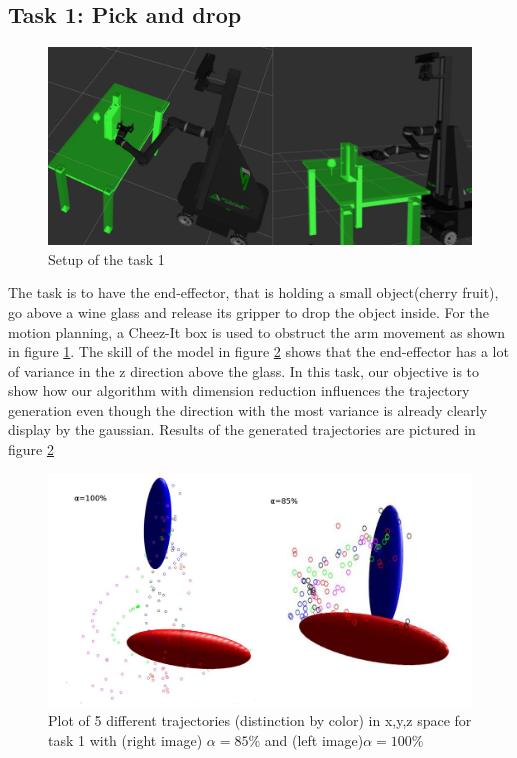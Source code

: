 \documentclass[letterpaper, 10 pt, conference]{ieeeconf}  %
\begin{document}
\subsection{Task 1: Pick and drop}
\begin{figure}[h]
	\centering
	\includegraphics[scale=0.22]{figure/task1Scenario.png}
	\caption{Setup of the task 1}
	\label{task1Scenario}
\end{figure}
The task is to have the end-effector, that is holding a small object(cherry fruit), go above a wine glass and release its gripper to drop the object inside. For the motion planning, a Cheez-It box is used to obstruct the arm movement as shown in figure \ref{task1Scenario}. The skill of the model in figure \ref{trajectoriesTask1} shows that the end-effector has a lot of variance in the z direction above the glass. In this task, our objective is to show how our algorithm with dimension reduction influences the trajectory generation even though the direction with the most variance is already clearly display by the gaussian. Results of the generated trajectories are pictured in figure \ref{trajectoriesTask1} \\
\begin{figure}[h]
	\centering
	\includegraphics[scale=0.16]{figure/plotMixedTask1.png}
	\caption{Plot of 5 different trajectories (distinction by color) in x,y,z space for task 1 with (right image) $\alpha = 85\%$ and (left image)$\alpha = 100\%$ }
	\label{trajectoriesTask1}
\end{figure}
\end{document}
